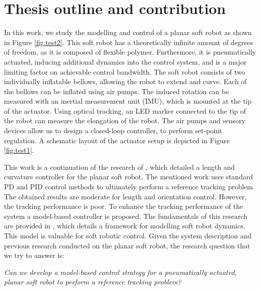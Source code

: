 \section*{Thesis outline and contribution}

In this work, we study the modelling and control of a planar soft robot as shown in Figure \ref{fig:test2}. This soft robot has a theoretically infinite amount of degrees of freedom, as it is composed of flexible polymer. Furthermore, it is pneumatically actuated, inducing additional dynamics into the control system, and is a major limiting factor on achievable control bandwidth. The soft robot consists of two individually inflatable bellows, allowing the robot to extend and curve. Each of the bellows can be inflated using air pumps. The induced rotation can be measured with an inertial measurement unit (IMU), which is mounted at the tip of the actuator. Using optical tracking, an LED marker connected to the tip of the robot can measure the elongation of the robot. The air pumps and sensory devices allow us to design a closed-loop controller, to perform set-point regulation. A schematic layout of the actuator setup is depicted in Figure \ref{fig:test1}.

This work is a continuation of the research of \cite{berkers}, which detailed a length and curvature controller for the planar soft robot. The mentioned work uses standard PD and PID control methods to ultimately perform a reference tracking problem. The obtained results are moderate for length and orientation control. However, the tracking performance is poor. To enhance the tracking performance of the system a model-based controller is proposed. The fundamentals of this research are provided in \cite{Caasenbrood2020}, which details a framework for modelling soft robot dynamics. This model is valuable for soft robotic control. Given the system description and previous research conducted on the planar soft robot, the research question that we try to answer is:

\textit{Can we develop a model-based control strategy for a pneumatically actuated, planar soft robot to perform a reference tracking problem?}



